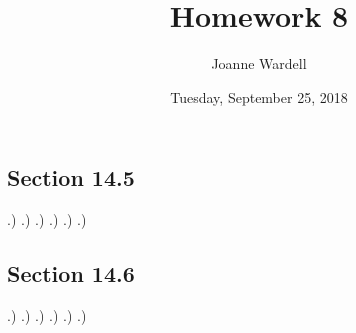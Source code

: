 \documentclass[12pt]{article}
\title{\vspace{-2.0cm}Homework 8}
\author{Joanne Wardell}
\date{Tuesday, September 25, 2018}
\begin{document}
\maketitle

\subsection*{Section 14.5}

.) 
.)
.)
.)
.)
.)



\subsection*{Section 14.6}

.)
.)
.)
.)
.)
.)
\end{document}
